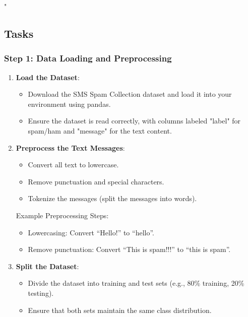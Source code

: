 \documentclass{article}
\begin{document}
"

\subsection*{Tasks}

\subsubsection*{Step 1: Data Loading and Preprocessing}
\begin{enumerate}
    \item \textbf{Load the Dataset}:
    \begin{itemize}
        \item Download the SMS Spam Collection dataset and load it into your environment using pandas.
        \item Ensure the dataset is read correctly, with columns labeled "label" for spam/ham and "message" for the text content.
    \end{itemize}
    
    \item \textbf{Preprocess the Text Messages}:
    \begin{itemize}
        \item Convert all text to lowercase.
        \item Remove punctuation and special characters.
        \item Tokenize the messages (split the messages into words).
    \end{itemize}
    Example Preprocessing Steps:
    \begin{itemize}
        \item Lowercasing: Convert ``Hello!'' to ``hello''.
        \item Remove punctuation: Convert ``This is spam!!!'' to ``this is spam''.
    \end{itemize}
    
    \item \textbf{Split the Dataset}:
    \begin{itemize}
        \item Divide the dataset into training and test sets (e.g., 80\% training, 20\% testing).
        \item Ensure that both sets maintain the same class distribution.
    \end{itemize}
\end{enumerate}
\end{document}
